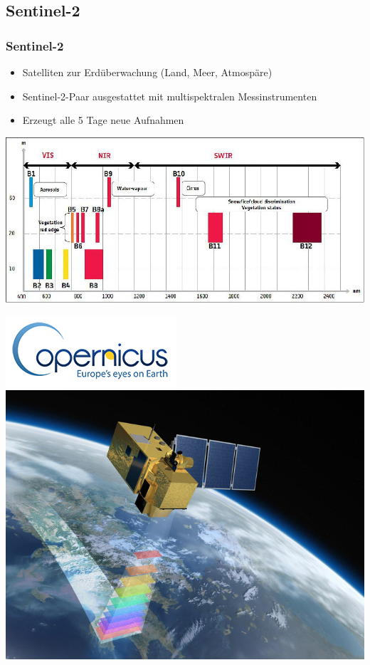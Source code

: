 \documentclass{beamer}
\begin{document}
\begin{frame}\section{Sentinel-2}\frametitle{Sentinel-2}
\begin{minipage}{0.5\textwidth}
	\centering
	\begin{itemize}
		\item Satelliten zur Erdüberwachung (Land, Meer, Atmospäre)
		\item Sentinel-2-Paar ausgestattet mit multispektralen Messinstrumenten
		\item Erzeugt alle 5 Tage neue Aufnahmen
	\end{itemize}
	\vspace{1em}
	\includegraphics[width=0.9\linewidth]{pics/sentinel-2-bands.png}
\end{minipage}
\begin{minipage}{0.4\textwidth}
	\centering
	\includegraphics[width=0.5\linewidth]{pics/copernicus-logo.png}\\
	\vspace{3em}
	\includegraphics[width=1\linewidth]{pics/Sentinel-2-scanning.png}
\end{minipage}
\end{frame}
\end{document}
